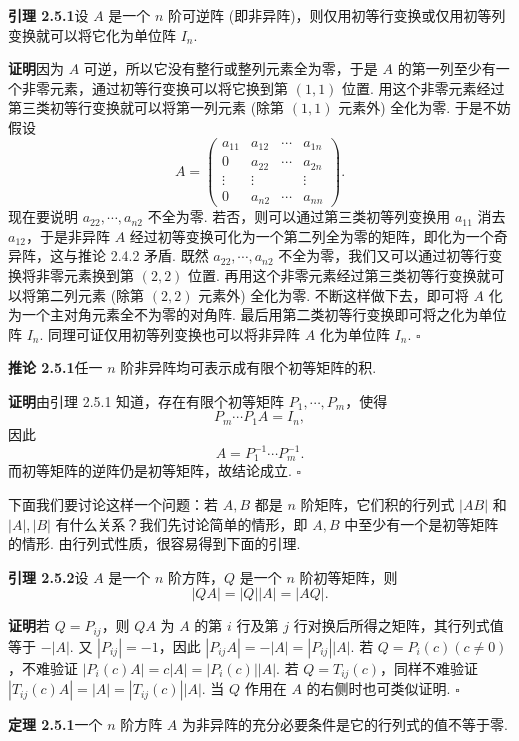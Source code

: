 \documentclass[UTF8, 12pt, fontset=fandol, oneside]{ctexart}
\begin{document}
\noindent\textbf{引理 2.5.1}\quad 设 $A$ 是一个 $n$ 阶可逆阵 (即非异阵)，则仅用初等行变换或仅用初等列变换就可以将它化为单位阵 $I_n$.

\noindent\textbf{证明}\quad 因为 $A$ 可逆，所以它没有整行或整列元素全为零，于是 $A$ 的第一列至少有一个非零元素，通过初等行变换可以将它换到第 $(1,1)$ 位置. 用这个非零元素经过第三类初等行变换就可以将第一列元素 (除第 $(1,1)$ 元素外) 全化为零. 于是不妨假设
\[
A=\left(\begin{array}{cccc}
a_{11} & a_{12} & \cdots & a_{1n}\\
0 & a_{22} & \cdots & a_{2n}\\
\vdots & \vdots & & \vdots\\
0 & a_{n2} & \cdots & a_{nn}
\end{array}\right).
\]
现在要说明 $a_{22},\cdots,a_{n2}$ 不全为零. 若否，则可以通过第三类初等列变换用 $a_{11}$ 消去 $a_{12}$，于是非异阵 $A$ 经过初等变换可化为一个第二列全为零的矩阵，即化为一个奇异阵，这与推论 2.4.2 矛盾. 既然 $a_{22},\cdots,a_{n2}$ 不全为零，我们又可以通过初等行变换将非零元素换到第 $(2,2)$ 位置. 再用这个非零元素经过第三类初等行变换就可以将第二列元素 (除第 $(2,2)$ 元素外) 全化为零. 不断这样做下去，即可将 $A$ 化为一个主对角元素全不为零的对角阵. 最后用第二类初等行变换即可将之化为单位阵 $I_n$. 同理可证仅用初等列变换也可以将非异阵 $A$ 化为单位阵 $I_n$. $\square$

\noindent\textbf{推论 2.5.1}\quad 任一 $n$ 阶非异阵均可表示成有限个初等矩阵的积.

\noindent\textbf{证明}\quad 由引理 2.5.1 知道，存在有限个初等矩阵 $P_1,\cdots,P_m$，使得
\[
P_m\cdots P_1A=I_n,
\]
因此
\[
A=P_1^{-1}\cdots P_m^{-1}.
\]
而初等矩阵的逆阵仍是初等矩阵，故结论成立. $\square$

下面我们要讨论这样一个问题：若 $A,B$ 都是 $n$ 阶矩阵，它们积的行列式 $|AB|$ 和 $|A|,|B|$ 有什么关系？我们先讨论简单的情形，即 $A,B$ 中至少有一个是初等矩阵的情形. 由行列式性质，很容易得到下面的引理.

\noindent\textbf{引理 2.5.2}\quad 设 $A$ 是一个 $n$ 阶方阵，$Q$ 是一个 $n$ 阶初等矩阵，则
\[
|QA|=|Q||A|=|AQ|.
\]

\noindent\textbf{证明}\quad 若 $Q=P_{ij}$，则 $QA$ 为 $A$ 的第 $i$ 行及第 $j$ 行对换后所得之矩阵，其行列式值等于 $-|A|$. 又 $|P_{ij}|=-1$，因此 $|P_{ij}A|=-|A|=|P_{ij}||A|$. 若 $Q=P_i(c)(c\ne 0)$，不难验证 $|P_i(c)A|=c|A|=|P_i(c)||A|$. 若 $Q=T_{ij}(c)$，同样不难验证 $|T_{ij}(c)A|=|A|=|T_{ij}(c)||A|$. 当 $Q$ 作用在 $A$ 的右侧时也可类似证明. $\square$

\noindent\textbf{定理 2.5.1}\quad 一个 $n$ 阶方阵 $A$ 为非异阵的充分必要条件是它的行列式的值不等于零.
\end{document}
